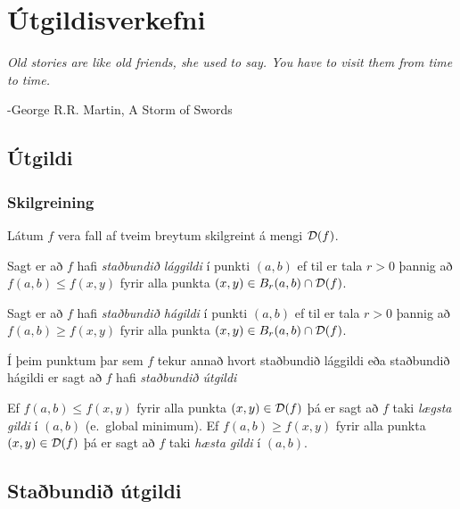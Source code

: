 \documentclass[a4paper,10pt,icelandic]{sphinxmanual}
\begin{document}
\chapter{Útgildisverkefni}
\label{Kafli3::doc}\label{Kafli3:utgildisverkefni}
\emph{Old stories are like old friends, she used to say. You have to visit them from time to time.}

-George R.R. Martin, A Storm of Swords


\section{Útgildi}
\label{Kafli3:utgildi}\label{Kafli3:index-0}

\subsection{Skilgreining}
\label{Kafli3:skilgreining}
Látum \(f\) vera fall af tveim breytum skilgreint á mengi
\({\cal D}(f)\).

Sagt er að \(f\) hafi \textit{staðbundið lággildi} í
punkti \((a,b)\) ef til er tala \(r>0\) þannig að
\(f(a,b)\leq f(x,y)\) fyrir alla punkta
\((x,y)\in B_r(a,b)\cap{\cal D}(f)\).

Sagt er að \(f\) hafi \textit{staðbundið hágildi}  í
punkti \((a,b)\) ef til er tala \(r>0\) þannig að
\(f(a,b)\geq f(x,y)\) fyrir alla punkta
\((x,y)\in B_r(a,b)\cap{\cal D}(f)\).

Í þeim punktum þar sem \(f\) tekur annað hvort staðbundið lággildi
eða staðbundið hágildi er sagt að \(f\) hafi \textit{staðbundið útgildi}

Ef \(f(a,b)\leq f(x,y)\) fyrir alla punkta
\((x,y)\in {\cal D}(f)\) þá er sagt að \(f\) taki \emph{lægsta gildi}
í \((a,b)\) (e. global minimum). Ef \(f(a,b)\geq f(x,y)\) fyrir
alla punkta \((x,y)\in {\cal D}(f)\) þá er sagt að \(f\) taki
\textit{hæsta gildi} í \((a,b)\).


\section{Staðbundið útgildi}
\label{Kafli3:index-1}\label{Kafli3:stabundi-utgildi}
\end{document}
